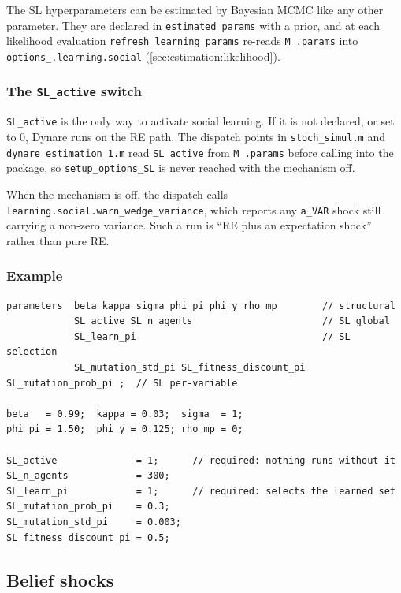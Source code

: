 \documentclass[11pt,a4paper]{article}
\newcommand{\command}[1]{\texttt{#1}}
\newcommand{\field}[1]{\texttt{#1}}
\newcommand{\file}[1]{\texttt{#1}}
\begin{document}
The SL hyperparameters can be estimated by Bayesian MCMC like any other
parameter. They are declared in \command{estimated\_params} with a prior, and at
each likelihood evaluation \texttt{refresh\_learning\_params} re-reads
\field{M\_.params} into \field{options\_.learning.social}
(\cref{sec:estimation:likelihood}).

\subsubsection{The \texttt{SL\_active} switch}

\texttt{SL\_active} is the only way to activate social learning. If it is not
declared, or set to 0, Dynare runs on the RE path. The dispatch points in
\file{stoch\_simul.m} and \file{dynare\_estimation\_1.m} read
\texttt{SL\_active} from \field{M\_.params} before calling into the package, so
\texttt{setup\_options\_SL} is never reached with the mechanism off.

\medskip
\noindent
When the mechanism is off, the dispatch calls
\texttt{learning.social.warn\_wedge\_variance}, which reports any
\texttt{a\_VAR} shock still carrying a non-zero variance. Such a run is ``RE
plus an expectation shock'' rather than pure RE.

\subsubsection{Example}

\begin{lstlisting}[style=dynare, caption={SL parameters in the \texttt{.mod} file}]
parameters  beta kappa sigma phi_pi phi_y rho_mp        // structural
            SL_active SL_n_agents                       // SL global
            SL_learn_pi                                 // SL selection
            SL_mutation_std_pi SL_fitness_discount_pi SL_mutation_prob_pi ;  // SL per-variable

beta   = 0.99;  kappa = 0.03;  sigma  = 1;
phi_pi = 1.50;  phi_y = 0.125; rho_mp = 0;

SL_active              = 1;      // required: nothing runs without it
SL_n_agents            = 300;
SL_learn_pi            = 1;      // required: selects the learned set
SL_mutation_prob_pi    = 0.3;
SL_mutation_std_pi     = 0.003;
SL_fitness_discount_pi = 0.5;
\end{lstlisting}


\subsection{Belief shocks}
\label{sec:declaration:beliefs}
 
\end{document}
